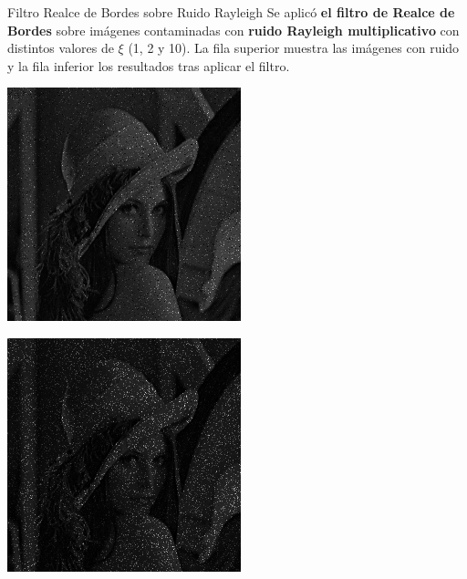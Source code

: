 \documentclass{beamer}
\begin{document}
\begin{frame}[fragile]{Filtro Realce de Bordes sobre Ruido Rayleigh}
	\justifying
	\footnotesize
	Se aplicó \textcolor{unahurverde}{\textbf{el filtro de Realce de Bordes}} sobre imágenes contaminadas con \textcolor{unahurverde}{\textbf{ruido Rayleigh multiplicativo}}  
	con distintos valores de $\xi$ (1, 2 y 10).  
	La fila superior muestra las imágenes con ruido y la fila inferior los resultados tras aplicar el filtro.
	
	\centering
	\begin{minipage}{0.25\linewidth}
		\centering
		\includegraphics[width=\linewidth]{../results/lena_rayleigh_xi1}
	\end{minipage}\hfill
	\begin{minipage}{0.25\linewidth}
		\centering
		\includegraphics[width=\linewidth]{../results/lena_rayleigh_xi2}

\end{minipage}
\end{frame}
\end{document}
